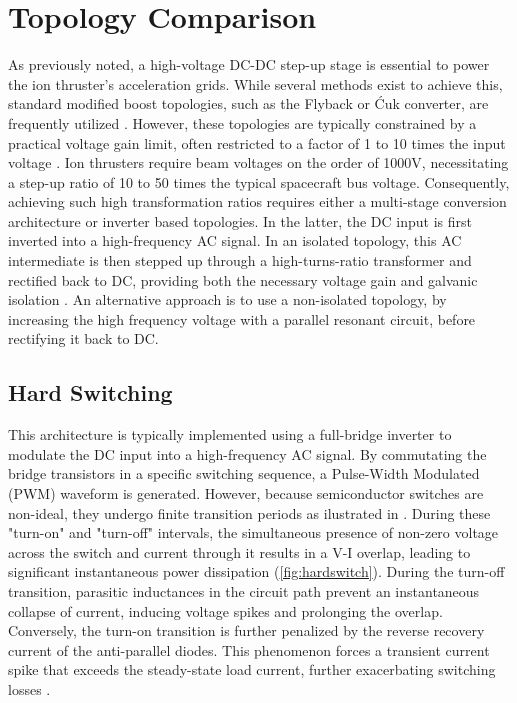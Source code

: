 \section{Topology Comparison}
As previously noted, a high-voltage DC-DC step-up stage is essential to power the ion thruster's acceleration grids. While several methods exist to achieve this, standard modified boost topologies, such as the Flyback or Ćuk converter, are frequently utilized \cite{mohan2003power}. However, these topologies are typically constrained by a practical voltage gain limit, often restricted to a factor of 1 to 10 times the input voltage \cite{tofoli2015survey}. Ion thrusters require beam voltages on the order of 1000V, necessitating a step-up ratio of 10 to 50 times the typical spacecraft bus voltage. Consequently, achieving such high transformation ratios requires either a multi-stage conversion architecture or inverter based topologies. In the latter, the DC input is first inverted into a high-frequency AC signal. In an isolated topology, this AC intermediate is then stepped up through a high-turns-ratio transformer and rectified back to DC, providing both the necessary voltage gain and galvanic isolation \cite{mohan2003power}. An alternative approach is to use a non-isolated topology, by increasing the high frequency voltage with a parallel resonant circuit, before rectifying it back to DC.
\subsection{Hard Switching}
This architecture is typically implemented using a full-bridge inverter to modulate the DC input into a high-frequency AC signal. By commutating the bridge transistors in a specific switching sequence, a Pulse-Width Modulated (PWM) waveform is generated. However, because semiconductor switches are non-ideal, they undergo finite transition periods as ilustrated in . During these "turn-on" and "turn-off" intervals, the simultaneous presence of non-zero voltage across the switch and current through it results in a V-I overlap, leading to significant instantaneous power dissipation (\autoref{fig:hardswitch}). During the turn-off transition, parasitic inductances in the circuit path prevent an instantaneous collapse of current, inducing voltage spikes and prolonging the overlap. Conversely, the turn-on transition is further penalized by the reverse recovery current of the anti-parallel diodes. This phenomenon forces a transient current spike that exceeds the steady-state load current, further exacerbating switching losses \cite{kassakian2023principles}.

